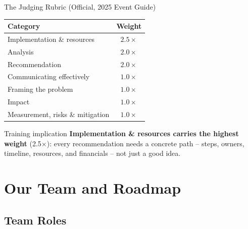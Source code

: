 \documentclass[aspectratio=169,11pt]{beamer}
\begin{document}
\begin{frame}{The Judging Rubric (Official, 2025 Event Guide)}
  \begin{center}
    \begin{tabular}{lc}
      \toprule
      \textbf{Category} & \textbf{Weight} \\
      \midrule
      Implementation \& resources & $2.5\times$ \\
      Analysis & $2.0\times$ \\
      Recommendation & $2.0\times$ \\
      Communicating effectively & $1.0\times$ \\
      Framing the problem & $1.0\times$ \\
      Impact & $1.0\times$ \\
      Measurement, risks \& mitigation & $1.0\times$ \\
      \bottomrule
    \end{tabular}
  \end{center}
  \begin{alertblock}{Training implication}
    \textbf{Implementation \& resources carries the highest weight} (2.5$\times$): every recommendation needs a concrete path -- steps, owners, timeline, resources, and financials -- not just a good idea.
  \end{alertblock}
\end{frame}


\section{Our Team and Roadmap}

\subsection{Team Roles}
\end{document}
